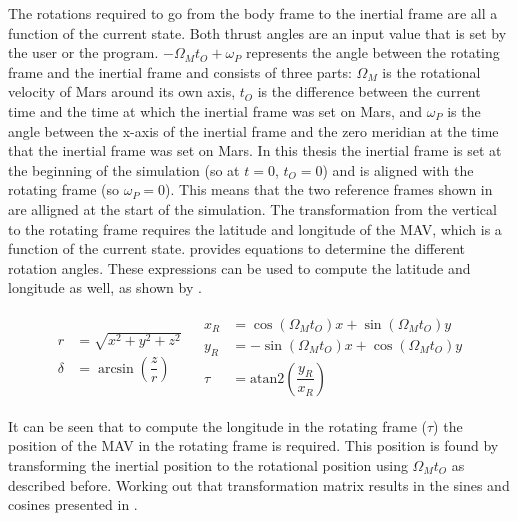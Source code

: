 \noindent
The rotations required to go from the body frame to the inertial frame are all a function of the current state. Both thrust angles are an input value that is set by the user or the program. $-\Omega_{M}t_{O}+\omega_{P}$ represents the angle between the rotating frame and the inertial frame and consists of three parts: $\Omega_{M}$ is the rotational velocity of Mars around its own axis, $t_{O}$ is the difference between the current time and the time at which the inertial frame was set on Mars, and $\omega_{P}$ is the angle between the x-axis of the inertial frame and the zero meridian at the time that the inertial frame was set on Mars. In this thesis the inertial frame is set at the beginning of the simulation (so at $t=0$, $t_{O}=0$) and is aligned with the rotating frame (so $\omega_{P}=0$). This means that the two reference frames shown in  are alligned at the start of the simulation. The transformation from the vertical to the rotating frame requires the latitude and longitude of the \ac{MAV}, which is a function of the current state. \cite{mooij1994motion} provides equations to determine the different rotation angles. These expressions can be used to compute the latitude and longitude as well, as shown by .

\begin{align} \label{eq:latAndLong}
\begin{split} 
r&=\sqrt{x^{2}+y^{2}+z^{2}}\\
\delta&=\arcsin\left(\dfrac{z}{r}\right)
\end{split} 
&
\begin{split}
x_{R}&=\cos\left(\Omega_{M}t_{O}\right)x+\sin\left(\Omega_{M}t_{O}\right)y\\
y_{R}&=-\sin\left(\Omega_{M}t_{O}\right)x+\cos\left(\Omega_{M}t_{O}\right)y\\
\tau&=\text{atan2}\left(\dfrac{y_{R}}{x_{R}}\right)
\end{split}
\end{align}

\noindent 
It can be seen that to compute the longitude in the rotating frame ($\tau$) the position of the \ac{MAV} in the rotating frame is required. This position is found by transforming the inertial position to the rotational position using $\Omega_{M}t_{O}$ as described before. Working out that transformation matrix results in the sines and cosines presented in .\\

